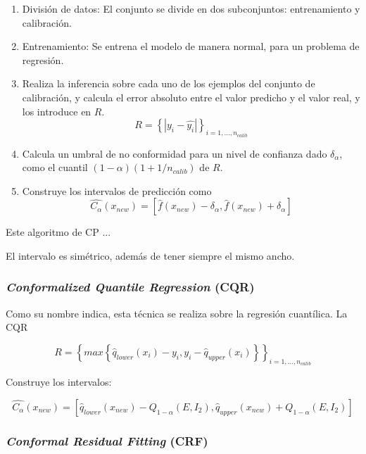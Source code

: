 \begin{enumerate}
    \item División de datos: El conjunto se divide en dos subconjuntos: entrenamiento y calibración.
    
    \item Entrenamiento: Se entrena el modelo de manera normal, para un problema de regresión. 
    
    \item Realiza la inferencia sobre cada uno de los ejemplos del conjunto de calibración, y calcula el
          error absoluto entre el valor predicho y el valor real, y los introduce en $R$.
          $$
          R = \left\{ | y_i - \hat{y_i} | \right\}_{i=1,...,n_{calib}}
          $$
    
    \item Calcula un umbral de no conformidad para un nivel de confianza dado $\delta_\alpha$, como el cuantil 
    $(1-\alpha)(1+1/n_{calib})$ de $R$.
    
    \item Construye los intervalos de predicción como
        $$
        \hat{C_\alpha}(x_{new}) = \left[ \hat{f}(x_{new})- \delta_\alpha, \hat{f}(x_{new})+ \delta_\alpha\right]
        $$
    
\end{enumerate}

Este algoritmo de CP ...


El intervalo es simétrico, además de tener siempre el mismo ancho. 




\subsubsection{\textit{Conformalized Quantile Regression} (CQR)}

Como su nombre indica, esta técnica se realiza sobre la regresión cuantílica. La CQR \cite{romano2019} 


$$
R = \left\{ 
        max\left\{ \hat{q}_{lower}(x_i) - y_i, 
        y_i - \hat{q}_{upper}(x_i) \right\} 
    \right\}_{i=1,...,n_{calib}}
$$

Construye los intervalos:

$$
\hat{C_\alpha}(x_{new}) = 
    \left[ 
        \hat{q}_{lower}(x_{new}) - Q_{1-\alpha}(E,I_2), 
        \hat{q}_{upper}(x_{new}) + Q_{1-\alpha}(E,I_2) 
    \right]
$$


\subsubsection{\textit{Conformal Residual Fitting} (CRF)}



